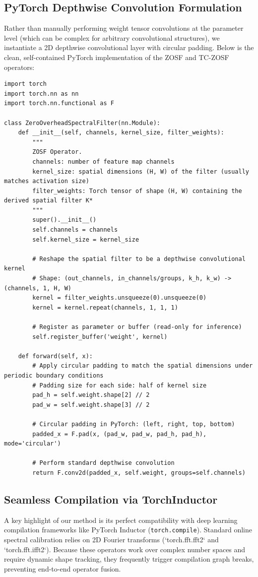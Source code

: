 \documentclass{article}
\theoremstyle{plain}
\theoremstyle{definition}
\theoremstyle{remark}
\begin{document}
\subsection{PyTorch Depthwise Convolution Formulation}
Rather than manually performing weight tensor convolutions at the parameter level (which can be complex for arbitrary convolutional structures), we instantiate a 2D depthwise convolutional layer with circular padding. Below is the clean, self-contained PyTorch implementation of the ZOSF and TC-ZOSF operators:

\begin{verbatim}
import torch
import torch.nn as nn
import torch.nn.functional as F

class ZeroOverheadSpectralFilter(nn.Module):
    def __init__(self, channels, kernel_size, filter_weights):
        """
        ZOSF Operator.
        channels: number of feature map channels
        kernel_size: spatial dimensions (H, W) of the filter (usually matches activation size)
        filter_weights: Torch tensor of shape (H, W) containing the derived spatial filter K*
        """
        super().__init__()
        self.channels = channels
        self.kernel_size = kernel_size
        
        # Reshape the spatial filter to be a depthwise convolutional kernel
        # Shape: (out_channels, in_channels/groups, k_h, k_w) -> (channels, 1, H, W)
        kernel = filter_weights.unsqueeze(0).unsqueeze(0)
        kernel = kernel.repeat(channels, 1, 1, 1)
        
        # Register as parameter or buffer (read-only for inference)
        self.register_buffer('weight', kernel)
        
    def forward(self, x):
        # Apply circular padding to match the spatial dimensions under periodic boundary conditions
        # Padding size for each side: half of kernel size
        pad_h = self.weight.shape[2] // 2
        pad_w = self.weight.shape[3] // 2
        
        # Circular padding in PyTorch: (left, right, top, bottom)
        padded_x = F.pad(x, (pad_w, pad_w, pad_h, pad_h), mode='circular')
        
        # Perform standard depthwise convolution
        return F.conv2d(padded_x, self.weight, groups=self.channels)
\end{verbatim}

\subsection{Seamless Compilation via TorchInductor}
A key highlight of our method is its perfect compatibility with deep learning compilation frameworks like PyTorch Inductor (\texttt{torch.compile}). Standard online spectral calibration relies on 2D Fourier transforms (`torch.fft.fft2` and `torch.fft.ifft2`). Because these operators work over complex number spaces and require dynamic shape tracking, they frequently trigger compilation graph breaks, preventing end-to-end operator fusion.
\end{document}
